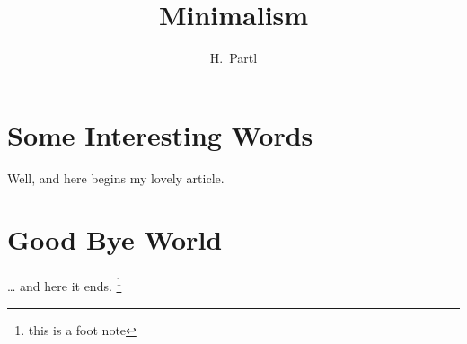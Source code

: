 \documentclass[a4paper,11pt]{article}
\author{H.~Partl}
\title{Minimalism}
\begin{document}
\maketitle
\tableofcontents
\section{Some Interesting Words}
Well, and here begins my lovely article.
\section{Good Bye World}
\ldots{} and here it ends.
\footnote{this is a foot note}
\end{document}
